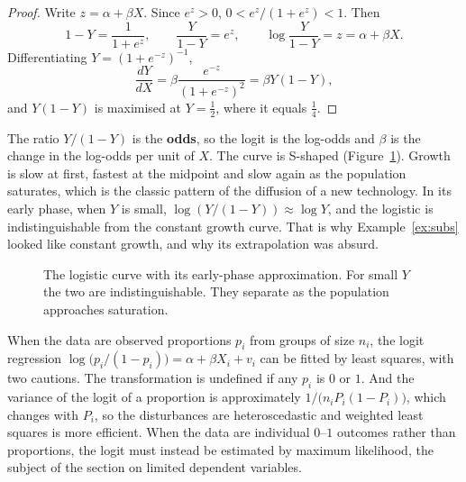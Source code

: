 \documentclass[11pt,a4paper]{article}
\numberwithin{equation}{section}
\theoremstyle{definition}
\begin{document}
\begin{proof}
Write $z = \alpha + \beta X$. Since $e^z > 0$, $0 < e^z/(1 + e^z) < 1$. Then
\[
1 - Y = \frac{1}{1 + e^z}, \qquad \frac{Y}{1 - Y} = e^z, \qquad \log\frac{Y}{1 - Y} = z = \alpha + \beta X .
\]
Differentiating $Y = (1 + e^{-z})^{-1}$,
\[
\frac{dY}{dX} = \beta\frac{e^{-z}}{(1 + e^{-z})^2} = \beta Y(1 - Y) ,
\]
and $Y(1 - Y)$ is maximised at $Y = \frac12$, where it equals $\frac14$.
\end{proof}

The ratio $Y/(1 - Y)$ is the \textbf{odds}, so the logit is the log-odds and $\beta$ is the change in the log-odds per unit of $X$. The curve is
S-shaped (Figure~\ref{fig:logistic}). Growth is slow at first, fastest at the midpoint and slow again as the population saturates, which is the
classic pattern of the diffusion of a new technology. In its early phase, when $Y$ is small, $\log(Y/(1 - Y)) \approx \log Y$, and the logistic is
indistinguishable from the constant growth curve. That is why Example~\ref{ex:subs} looked like constant growth, and why its extrapolation was
absurd.

\begin{figure}[H]
\centering
{}
\caption{The logistic curve with its early-phase approximation. For small $Y$ the two are indistinguishable. They separate as the
population approaches saturation.}
\label{fig:logistic}
\end{figure}

When the data are observed proportions $p_i$ from groups of size $n_i$, the logit regression $\log\bigl(p_i/(1 - p_i)\bigr) = \alpha + \beta X_i + v_i$
can be fitted by least squares, with two cautions. The transformation is undefined if any $p_i$ is $0$ or $1$. And the variance of the logit of a
proportion is approximately $1/\bigl(n_iP_i(1 - P_i)\bigr)$, which changes with $P_i$, so the disturbances are heteroscedastic and weighted least
squares is more efficient. When the data are individual $0$--$1$ outcomes rather than proportions, the logit must instead be estimated by
maximum likelihood, the subject of the section on limited dependent variables.
\end{document}

